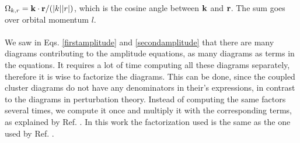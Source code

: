 $\Omega_{k,r}=\bold k\cdot \bold r/(|k||r|)$, which is the cosine angle between $\bold k$ and $\bold r$. The sum goes over orbital momentum $l$.\\ 
\\
We saw in Eqs. \eqref{firstamplitude} and \eqref{secondamplitude} that there
are many diagrams contributing to the amplitude equations, as many diagrams
as terms in the equations. It requires a lot of time computing all these
diagrams separately, therefore it is wise to 
factorize the diagrams. This can be done, since the coupled cluster diagrams do not have any denominators in their's expressions,
in contrast to the diagrams in perturbation theory. 
Instead of computing the same factors several times, we compute it once and
multiply it with the corresponding terms, as explained by Ref. \cite{bartlett:291}. In this work the factorization used is the same as the one used by Ref. \cite{hagen:034302}.

